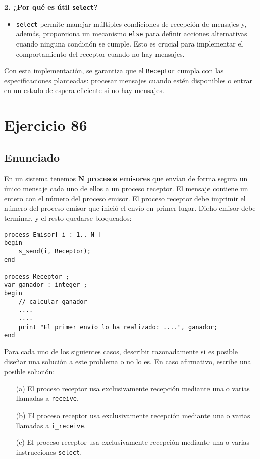 \documentclass[a4paper,12pt]{article}
\begin{document}
\textbf{2. ¿Por qué es útil \texttt{select}?}  
\begin{itemize}
  \item \texttt{select} permite manejar múltiples condiciones de recepción de mensajes y, además, proporciona un mecanismo \texttt{else} para definir acciones alternativas cuando ninguna condición se cumple. Esto es crucial para implementar el comportamiento del receptor cuando no hay mensajes.
\end{itemize}

Con esta implementación, se garantiza que el \texttt{Receptor} cumpla con las especificaciones planteadas: procesar mensajes cuando estén disponibles o entrar en un estado de espera eficiente si no hay mensajes.



\section{Ejercicio 86}
\subsection{Enunciado}

En un sistema tenemos \textbf{N procesos emisores} que envían de forma segura un único mensaje cada uno de ellos a un proceso receptor. El mensaje contiene un entero con el número del proceso emisor. El proceso receptor debe imprimir el número del proceso emisor que inició el envío en primer lugar. Dicho emisor debe terminar, y el resto quedarse bloqueados:

\begin{lstlisting}[style=customcpp]
process Emisor[ i : 1.. N ]
begin
    s_send(i, Receptor);
end

process Receptor ;
var ganador : integer ;
begin
    // calcular ganador
    ....
    ....
    print "El primer envío lo ha realizado: ....", ganador;
end
\end{lstlisting}

Para cada uno de los siguientes casos, describir razonadamente si es posible diseñar una solución a este problema o no lo es. En caso afirmativo, escribe una posible solución:

\begin{enumerate}
    \item[(a)] El proceso receptor usa exclusivamente recepción mediante una o varias llamadas a \texttt{receive}.
    \item[(b)] El proceso receptor usa exclusivamente recepción mediante una o varias llamadas a \texttt{i\_receive}.
    \item[(c)] El proceso receptor usa exclusivamente recepción mediante una o varias instrucciones \texttt{select}.
\end{enumerate}
\end{document}
